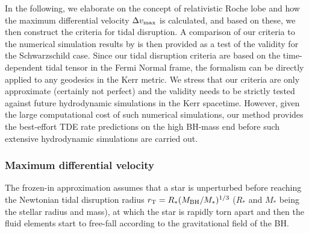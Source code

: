 \documentclass[useAMS,usenatbib]{mn2e}
\begin{document}
In the following, we elaborate on the concept of relativistic Roche lobe and how the maximum differential velocity $\Delta v_{\rm max}$ is calculated, and based on these, we then construct the criteria for tidal disruption. A comparison of our criteria to the numerical simulation results by \cite{Ryu2020a} is then provided as a test of the validity for the Schwarzschild case. Since our tidal disruption criteria are based on the time-dependent tidal tensor in the Fermi Normal frame, the formalism can be directly applied to any geodesics in the Kerr metric. We stress that our criteria are only approximate (certainly not perfect) and the validity needs to be strictly tested against future hydrodynamic simulations in the Kerr spacetime. However, given the large computational cost of such numerical simulations, our method provides the best-effort TDE rate predictions on the high BH-mass end before such extensive hydrodynamic simulations are carried out.

\subsubsection{Maximum differential velocity}\label{sec:max_deltav}
The frozen-in approximation \citep{stone13_frozen-in} assumes that a star is unperturbed before reaching the Newtonian tidal disruption radius $r_{\rm T} =R_*(M_{\rm BH}/M_*)^{1/3}$ ($R_*$ and $M_*$ being the stellar radius and mass), at which the star is rapidly torn apart and then the fluid elements start to free-fall according to the gravitational field of the BH.
\end{document}
